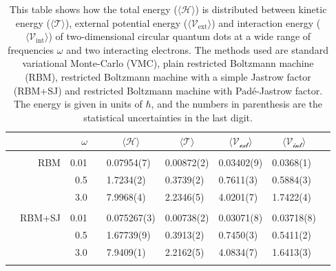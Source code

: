 \begin{table}
	\caption{This table shows how the total energy ($\langle\mathcal{H}\rangle$) is distributed between kinetic energy ($\langle\mathcal{T}\rangle$), external potential energy ($\langle\mathcal{V}_{\text{ext}}\rangle$) and interaction energy ($\langle\mathcal{V}_{\text{int}}\rangle$) of two-dimensional circular quantum dots at a wide range of frequencies $\omega$ and two interacting electrons. The methods used are standard variational Monte-Carlo (VMC), plain restricted Boltzmann machine (RBM), restricted Boltzmann machine with a simple Jastrow factor (RBM+SJ) and restricted Boltzmann machine with Padé-Jastrow factor. The energy is given in units of $\hbar$, and the numbers in parenthesis are the statistical uncertainties in the last digit.}
	\label{tab:splitfrequencyQD2D}
	\begin{tabularx}{\textwidth}{R{1cm}rrcR{2.3cm}R{2.3cm}R{2.3cm}R{2.3cm}R{0.3cm}} \hline\hline
		&\makecell{\\ \phantom{$N$} \\ \phantom{=}} & $\omega$ &&  &  &  &  \\ \hline \\
		&RBM & 0.01 && 0.07954(7) & 0.00872(2) & 0.03402(9) & 0.0368(1) \\
		&& 0.5 && 1.7234(2) & 0.3739(2) & 0.7611(3) & 0.5884(3)\\
		&& 3.0 && 7.9968(4) & 2.2346(5) & 4.0201(7) & 1.7422(4) \\ \hdashline \\
		
		&RBM+SJ & 0.01 && 0.075267(3) & 0.00738(2) & 0.03071(8) & 0.03718(8) \\
		&& 0.5 && 1.67739(9) & 0.3913(2) & 0.7450(3) & 0.5411(2)\\
		&& 3.0 && 7.9409(1) & 2.2162(5) & 4.0834(7) & 1.6413(3) \\ \hdashline \\
		

\end{tabularx}
\end{table}
